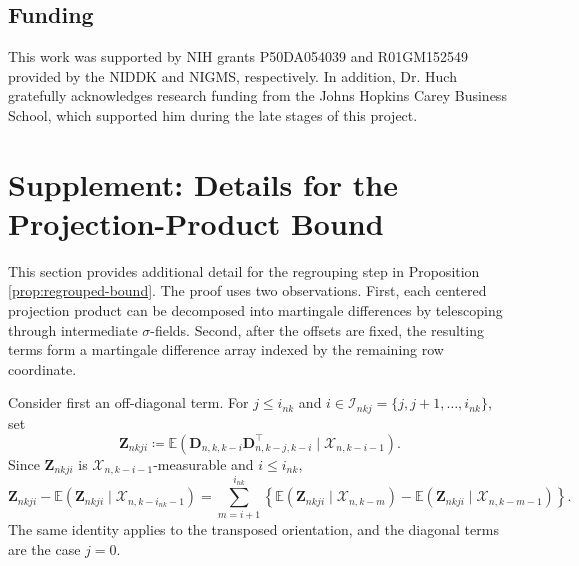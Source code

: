 \documentclass[11pt]{article}
\newif\ifanonymous
\renewcommand\vec[1]{\boldsymbol{#1}}
\newcommand\mat[1]{\mathbf{#1}}
\newcommand{\E}{\mathbb{E}}
\newcommand{\X}{\mathcal{X}}
\newcommand{\I}{\mathcal{I}}
\theoremstyle{definition}
\begin{document}
\ifanonymous
\else
\subsection*{Funding}
This work was supported by NIH grants P50DA054039 and R01GM152549 provided by the NIDDK and NIGMS, respectively.
In addition, Dr. Huch gratefully acknowledges research funding from the Johns Hopkins Carey Business School, which supported him during the late stages of this project.
\fi




\clearpage
\appendix

\section{Supplement: Details for the Projection-Product Bound}\label{sec:projection-bound-details}

This section provides additional detail for the regrouping step in Proposition \ref{prop:regrouped-bound}.
The proof uses two observations.
First, each centered projection product can be decomposed into martingale differences by telescoping through intermediate \(\sigma\)-fields.
Second, after the offsets are fixed, the resulting terms form a martingale difference array indexed by the remaining row coordinate.

Consider first an off-diagonal term.
For \(j\leq i_{nk}\) and \(i\in\I_{nkj}=\{j,j+1,\ldots,i_{nk}\}\), set
\[
\mat Z_{nkji}
\coloneqq
\E\left(
\vec D_{n,k,k-i}\vec D_{n,k-j,k-i}^{\top}
\mid \X_{n,k-i-1}
\right).
\]
Since \(\mat Z_{nkji}\) is \(\X_{n,k-i-1}\)-measurable and \(i\leq i_{nk}\),
\[
\mat Z_{nkji}
-
\E(\mat Z_{nkji}\mid\X_{n,k-i_{nk}-1})
=
\sum_{m=i+1}^{i_{nk}}
\left\{
\E(\mat Z_{nkji}\mid\X_{n,k-m})
-
\E(\mat Z_{nkji}\mid\X_{n,k-m-1})
\right\}.
\]
The same identity applies to the transposed orientation, and the diagonal terms are the case \(j=0\).
\end{document}
